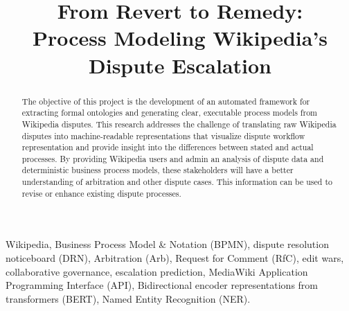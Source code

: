 \documentclass[conference]{IEEEtran}
\begin{document}
\title{From Revert to Remedy:\\
       Process Modeling Wikipedia’s Dispute Escalation}

\author{
\and
{}
\and
{}
}

\maketitle

\begin{abstract}
The objective of this project is the development of an automated framework for extracting formal ontologies and generating clear, executable process models from Wikipedia disputes. This research addresses the challenge of translating raw Wikipedia disputes into machine-readable representations that visualize dispute workflow representation and provide insight into the differences between stated and actual processes. By providing Wikipedia users and admin an analysis of dispute data and deterministic business process models, these stakeholders will have a better understanding of arbitration and other dispute cases. This information can be used to revise or enhance existing dispute processes.
\end{abstract}

\begin{IEEEkeywords}
Wikipedia, Business Process Model \& Notation (BPMN), dispute resolution noticeboard (DRN), Arbitration (Arb), Request for Comment (RfC), edit wars, collaborative governance, escalation prediction, MediaWiki Application Programming Interface (API), Bidirectional encoder representations from transformers (BERT), Named Entity Recognition (NER).
\end{IEEEkeywords}
\end{document}
